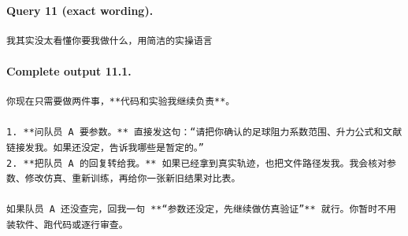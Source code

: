 \documentclass[UTF8,10pt]{ctexart}
\begin{document}
\paragraph{Query 11 (exact wording).}
\begin{Verbatim}[breaklines=true,breakanywhere=true,fontsize=\scriptsize,frame=single,framesep=2pt]
我其实没太看懂你要我做什么，用简洁的实操语言
\end{Verbatim}

\paragraph{Complete output 11.1.}
\begin{Verbatim}[breaklines=true,breakanywhere=true,fontsize=\scriptsize,frame=single,framesep=2pt]
你现在只需要做两件事，**代码和实验我继续负责**。

1. **问队员 A 要参数。** 直接发这句：“请把你确认的足球阻力系数范围、升力公式和文献链接发我。如果还没定，告诉我哪些是暂定的。”
2. **把队员 A 的回复转给我。** 如果已经拿到真实轨迹，也把文件路径发我。我会核对参数、修改仿真、重新训练，再给你一张新旧结果对比表。

如果队员 A 还没查完，回我一句 **“参数还没定，先继续做仿真验证”** 就行。你暂时不用装软件、跑代码或逐行审查。
\end{Verbatim}
\end{document}

